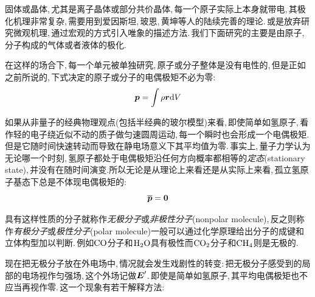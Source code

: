 固体或晶体,\,尤其是离子晶体或部分共价晶体,\,每一个原子实际上本身就带电,\,其极化机理非常复杂,\,需要用到爱因斯坦,\,玻恩,\,黄坤等人的陆续完善的理论.\,或是放弃研究微观机理,\,通过宏观的方式引入唯象的描述方法.\,我们下面研究的主要是由原子,\,分子构成的气体或者液体的极化.

在这样的场合下,\,每一个单元被单独研究,\,原子或分子整体是没有电性的,\,但是正如之前所说的,\,下式决定的原子或分子的电偶极矩不必为零:
\[\boldsymbol{p}=\int \rho \boldsymbol{r} \textrm{d} V\]

如果从非量子的经典物理观点(包括半经典的玻尔模型)来看,\,即使简单如氢原子,\,看作轻的电子绕近似不动的质子做匀速圆周运动,\,每一个瞬时也会形成一个电偶极矩.\,但是它随时间快速转动而导致在静电场意义下其平均值为零.\,事实上,\,量子力学认为无论哪一个时刻,\,氢原子都处于电偶极矩沿任何方向概率都相等的\emph{定态}(stationary state),\,并没有在随时间演变.\.所以无论是从理论上来看还是从实际上来看,\,孤立氢原子基态下总是不体现电偶极矩的:
\[\overline{\boldsymbol{p}}=\boldsymbol{0}\]

具有这样性质的分子就称作\emph{无极分子}或\emph{非极性分子}(nonpolar molecule),\,反之则称作\emph{有极分子}或\emph{极性分子}(polar molecule)一般可以通过化学原理给出分子的成键和立体构型加以判断.\,例如${\rm CO}$分子和${\rm H_2 O}$具有极性而${\rm CO_2}$分子和${\rm CH_4}$则是无极的.

现在把无极分子放在外电场中,\,情况就会发生戏剧性的转变:\,把无极分子感受到的局部的电场视作匀强场,\,这个外场记做$\boldsymbol{E}'$.\,即使是简单如氢原子,\,其平均电偶极矩也不应当再视作零.\,这一个现象有若干解释方法:

